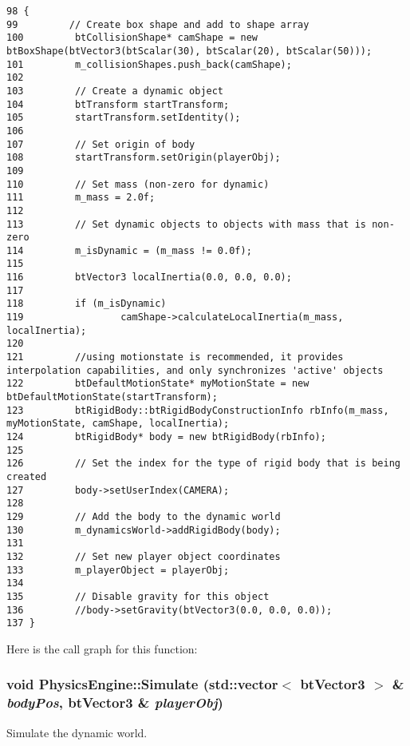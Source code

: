 \begin{Code}\begin{verbatim}98 {
99         // Create box shape and add to shape array
100         btCollisionShape* camShape = new btBoxShape(btVector3(btScalar(30), btScalar(20), btScalar(50)));
101         m_collisionShapes.push_back(camShape);
102 
103         // Create a dynamic object
104         btTransform startTransform;
105         startTransform.setIdentity();
106 
107         // Set origin of body
108         startTransform.setOrigin(playerObj);
109 
110         // Set mass (non-zero for dynamic)
111         m_mass = 2.0f;
112 
113         // Set dynamic objects to objects with mass that is non-zero
114         m_isDynamic = (m_mass != 0.0f);
115 
116         btVector3 localInertia(0.0, 0.0, 0.0);
117 
118         if (m_isDynamic)
119                 camShape->calculateLocalInertia(m_mass, localInertia);
120 
121         //using motionstate is recommended, it provides interpolation capabilities, and only synchronizes 'active' objects
122         btDefaultMotionState* myMotionState = new btDefaultMotionState(startTransform);
123         btRigidBody::btRigidBodyConstructionInfo rbInfo(m_mass, myMotionState, camShape, localInertia);
124         btRigidBody* body = new btRigidBody(rbInfo);
125 
126         // Set the index for the type of rigid body that is being created
127         body->setUserIndex(CAMERA);
128 
129         // Add the body to the dynamic world
130         m_dynamicsWorld->addRigidBody(body);
131 
132         // Set new player object coordinates
133         m_playerObject = playerObj;
134 
135         // Disable gravity for this object
136         //body->setGravity(btVector3(0.0, 0.0, 0.0));
137 }
\end{verbatim}
\end{Code}




Here is the call graph for this function:\hypertarget{class_physics_engine_9d6bec05e95efd4b9168b507a90883b9}{
\subsubsection[Simulate]{\setlength{\rightskip}{0pt plus 5cm}void PhysicsEngine::Simulate (std::vector$<$ btVector3 $>$ \& {\em bodyPos}, \/  btVector3 \& {\em playerObj})}}
\label{class_physics_engine_9d6bec05e95efd4b9168b507a90883b9}


Simulate the dynamic world. 

